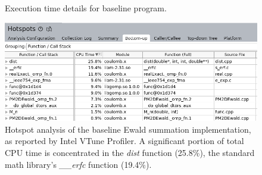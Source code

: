 \begin{figure}[H]
    \centering
    \begin{minipage}{0.7\textwidth}
    \end{minipage}%
    \begin{minipage}{0.3\textwidth}
        \caption{Execution time details for baseline program.}
    \end{minipage}
\end{figure}
\begin{figure}[H]
    \centering
    \includegraphics[width = \linewidth]{images/VTuneInitialHotspot.png}
    \caption{Hotspot analysis of the baseline Ewald summation implementation, as reported by Intel VTune Profiler. A significant portion of total CPU time is concentrated in the \textit{dist} function (25.8\%), the standard math library's \textit{\_\_erfc} function (19.4\%).}
    \label{fig:result1vtune}
\end{figure}

